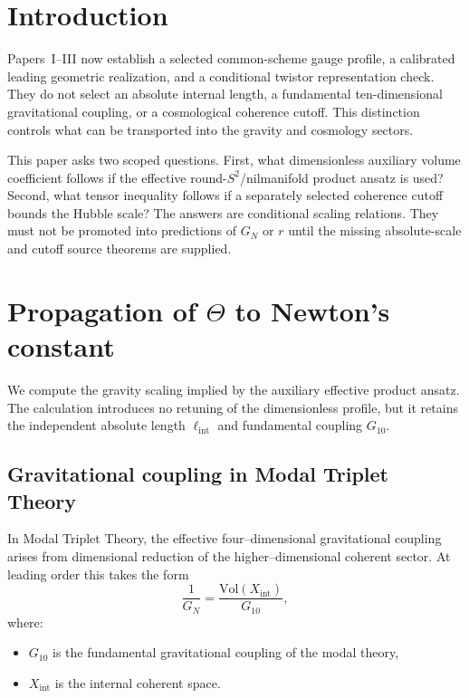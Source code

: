 \documentclass[11pt]{article}
\begin{document}
\section{Introduction}

Papers~I--III now establish a selected common-scheme gauge profile, a
calibrated leading geometric realization, and a conditional twistor
representation check. They do not select an absolute internal length, a
fundamental ten-dimensional gravitational coupling, or a cosmological
coherence cutoff. This distinction controls what can be transported into the
gravity and cosmology sectors.

This paper asks two scoped questions. First, what dimensionless auxiliary
volume coefficient follows if the effective round-$S^2$/nilmanifold product
ansatz is used? Second, what tensor inequality follows if a separately selected
coherence cutoff bounds the Hubble scale? The answers are conditional scaling
relations. They must not be promoted into predictions of $G_N$ or $r$ until
the missing absolute-scale and cutoff source theorems are supplied.


\section{Propagation of $\Theta$ to Newton's constant}

We compute the gravity scaling implied by the auxiliary effective product
ansatz. The calculation introduces no retuning of the dimensionless profile,
but it retains the independent absolute length $\ell_{\mathrm{int}}$ and
fundamental coupling $G_{10}$.

\subsection{Gravitational coupling in Modal Triplet Theory}

In Modal Triplet Theory, the effective four--dimensional gravitational coupling
arises from dimensional reduction of the higher--dimensional coherent sector.
At leading order this takes the form
\begin{equation}
\frac{1}{G_N}
=
\frac{\mathrm{Vol}(X_{\mathrm{int}})}{G_{10}},
\label{eq:GN_reduction}
\end{equation}
where:
\begin{itemize}
\item $G_{10}$ is the fundamental gravitational coupling of the modal theory,
\item $X_{\mathrm{int}}$ is the internal coherent space.
\end{itemize}
\end{document}
